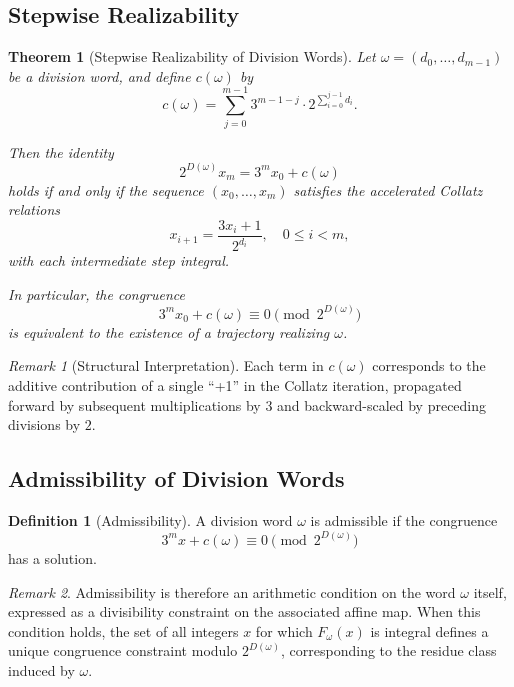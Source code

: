\documentclass[12pt, oneside]{article}
\numberwithin{equation}{section}
\theoremstyle{definition}
\newtheorem{definition}{Definition}[section]
\theoremstyle{plain}
\newtheorem{theorem}{Theorem}[section]
\theoremstyle{remark}
\newtheorem*{remark}{Remark}
\begin{document}
\subsection{Stepwise Realizability}

\begin{theorem}[Stepwise Realizability of Division Words]
\label{thm:stepwise-realizability}
Let $\omega = (d_0,\dots,d_{m-1})$ be a division word, and define $c(\omega)$ by
\[
c(\omega)
=
\sum_{j=0}^{m-1}
3^{m-1-j}\cdot 2^{\sum_{i=0}^{j-1} d_i}.
\]

Then the identity
\[
2^{D(\omega)} x_m = 3^m x_0 + c(\omega)
\]
holds if and only if the sequence $(x_0,\dots,x_m)$ satisfies the accelerated
Collatz relations
\[
x_{i+1} = \frac{3x_i+1}{2^{d_i}}, \quad 0 \le i < m,
\]
with each intermediate step integral.

In particular, the congruence
\[
3^m x_0 + c(\omega) \equiv 0 \pmod{2^{D(\omega)}}
\]
is equivalent to the existence of a trajectory realizing $\omega$.
\end{theorem}

\begin{remark}[Structural Interpretation]
Each term in $c(\omega)$ corresponds to the additive contribution of a single
``+1'' in the Collatz iteration, propagated forward by subsequent multiplications
by $3$ and backward-scaled by preceding divisions by $2$.
\end{remark}

\subsection{Admissibility of Division Words}


\begin{definition}[Admissibility]
\label{def:admissible-division-word}
A division word $\omega$ is admissible if the congruence
\[
3^m x + c(\omega) \equiv 0 \pmod{2^{D(\omega)}}
\]
has a solution.
\end{definition}
\begin{remark}
Admissibility is therefore an arithmetic condition on the word $\omega$
itself, expressed as a divisibility constraint on the associated affine
map. When this condition holds, the set of all integers $x$ for which
$F_\omega(x)$ is integral defines a unique congruence constraint modulo
$2^{D(\omega)}$, corresponding to the residue class induced by $\omega$.
\end{remark}
\end{document}
